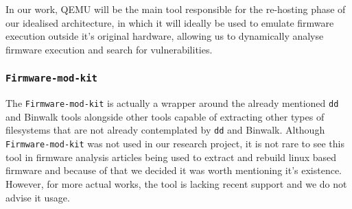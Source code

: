 In our work, QEMU will be the main tool responsible for the re-hosting phase of our idealised architecture, in which it will ideally be used to emulate firmware execution outside it's original hardware, allowing us to dynamically analyse firmware execution and search for vulnerabilities.

\subsubsection{ {\tt Firmware-mod-kit} }

The {\tt Firmware-mod-kit} \cite{google-code:firmware-mod-kit} is actually a wrapper around the already mentioned {\tt dd} and Binwalk tools alongside other tools capable of extracting other types of filesystems that are not already contemplated by {\tt dd} and Binwalk. Although {\tt Firmware-mod-kit} was not used in our research project, it is not rare to see this tool in firmware analysis articles being used to extract and rebuild linux based firmware and because of that we decided it was worth mentioning it's existence. However, for more actual works, the tool is lacking recent support and we do not advise it usage.